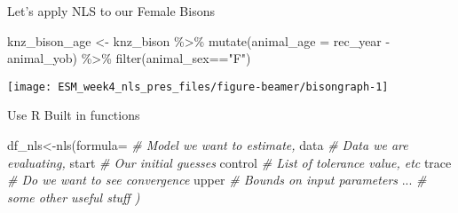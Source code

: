 \documentclass[
  ignorenonframetext,
]{beamer}
\newenvironment{Shaded}{\begin{snugshade}}{\end{snugshade}}
\newcommand{\AttributeTok}[1]{\textcolor[rgb]{0.77,0.63,0.00}{#1}}
\newcommand{\CommentTok}[1]{\textcolor[rgb]{0.56,0.35,0.01}{\textit{#1}}}
\newcommand{\FunctionTok}[1]{\textcolor[rgb]{0.00,0.00,0.00}{#1}}
\newcommand{\NormalTok}[1]{#1}
\newcommand{\OtherTok}[1]{\textcolor[rgb]{0.56,0.35,0.01}{#1}}
\newcommand{\SpecialCharTok}[1]{\textcolor[rgb]{0.00,0.00,0.00}{#1}}
\newcommand{\StringTok}[1]{\textcolor[rgb]{0.31,0.60,0.02}{#1}}
\begin{document}
\begin{frame}[fragile]{Let's apply NLS to our Female Bisons}
\protect\hypertarget{lets-apply-nls-to-our-female-bisons}{}
\begin{Shaded}
\begin{Highlighting}[]
\NormalTok{knz\_bison\_age }\OtherTok{\textless{}{-}}\NormalTok{ knz\_bison }\SpecialCharTok{\%\textgreater{}\%} 
  \FunctionTok{mutate}\NormalTok{(}\AttributeTok{animal\_age =}\NormalTok{ rec\_year }\SpecialCharTok{{-}}\NormalTok{ animal\_yob) }\SpecialCharTok{\%\textgreater{}\%} 
  \FunctionTok{filter}\NormalTok{(animal\_sex}\SpecialCharTok{==}\StringTok{"F"}\NormalTok{)}
\end{Highlighting}
\end{Shaded}

\begin{center}\texttt{[image: ESM\_week4\_nls\_pres\_files/figure-beamer/bisongraph-1]} \end{center}
\end{frame}

\begin{frame}[fragile]{Use R Built in functions}
\protect\hypertarget{use-r-built-in-functions}{}
\begin{Shaded}
\begin{Highlighting}[]
\NormalTok{df\_nls}\OtherTok{\textless{}{-}}\FunctionTok{nls}\NormalTok{(}\AttributeTok{formula=}   \CommentTok{\# Model we want to estimate,}
\NormalTok{            data   }\CommentTok{\# Data we are evaluating,}
\NormalTok{            start  }\CommentTok{\# Our initial guesses}
\NormalTok{            control }\CommentTok{\# List of tolerance value, etc}
\NormalTok{            trace  }\CommentTok{\# Do we want to see convergence}
\NormalTok{            upper  }\CommentTok{\# Bounds on input parameters}
\NormalTok{            ... }\CommentTok{\# some other useful stuff )}
\end{Highlighting}
\end{Shaded}
\end{frame}
\end{document}
